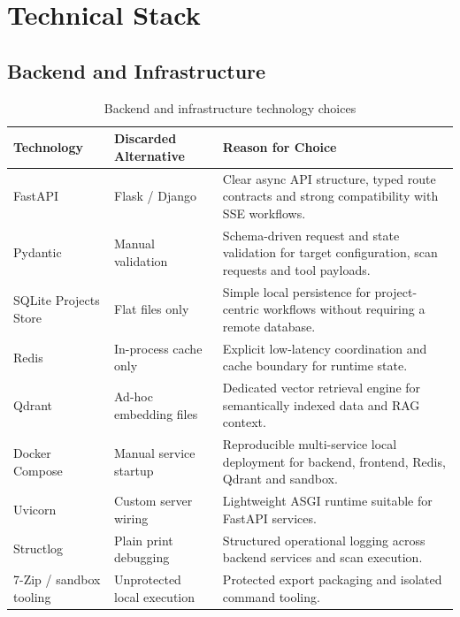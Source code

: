 \documentclass[12pt,a4paper]{report}
\begin{document}
\newpage
\section{Technical Stack}

\subsection{Backend and Infrastructure}

\begin{table}[H]
    \centering
    \caption{Backend and infrastructure technology choices}
    \label{tab:backend_stack}
    \renewcommand{\arraystretch}{1.35}
    \begin{tabular}{|p{}|p{}|p{}|}
        \hline
        \textbf{Technology} & \textbf{Discarded Alternative} & \textbf{Reason for Choice} \\
        \hline
        FastAPI & Flask / Django & Clear async API structure, typed route contracts and strong compatibility with SSE workflows. \\
        \hline
        Pydantic & Manual validation & Schema-driven request and state validation for target configuration, scan requests and tool payloads. \\
        \hline
        SQLite Projects Store & Flat files only & Simple local persistence for project-centric workflows without requiring a remote database. \\
        \hline
        Redis & In-process cache only & Explicit low-latency coordination and cache boundary for runtime state. \\
        \hline
        Qdrant & Ad-hoc embedding files & Dedicated vector retrieval engine for semantically indexed data and RAG context. \\
        \hline
        Docker Compose & Manual service startup & Reproducible multi-service local deployment for backend, frontend, Redis, Qdrant and sandbox. \\
        \hline
        Uvicorn & Custom server wiring & Lightweight ASGI runtime suitable for FastAPI services. \\
        \hline
        Structlog & Plain print debugging & Structured operational logging across backend services and scan execution. \\
        \hline
        7-Zip / sandbox tooling & Unprotected local execution & Protected export packaging and isolated command tooling. \\
        \hline
    \end{tabular}
\end{table}
\end{document}
